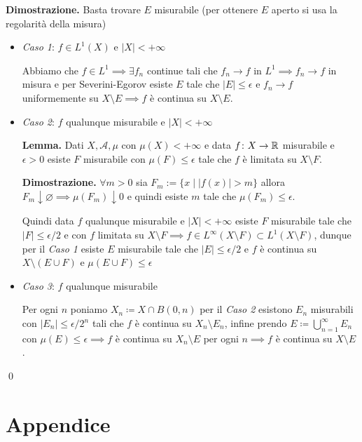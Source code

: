 \documentclass[a4paper, 12pt]{report}
\begin{document}
\textbf{Dimostrazione.}
Basta trovare $E$ misurabile (per ottenere $E$ aperto si usa la regolarità della misura)
\begin{itemize}
	\item \textit{Caso 1}:
		$f \in L^1(X)$ e $|X| < +\infty$

		Abbiamo che $f \in L^1 \implies \exists f_n$ continue tali che $f_n \to f$ in $L^1 \implies f_n \to f$ in misura e per Severini-Egorov esiste $E$ tale che $|E| \leq \epsilon$ e $f_n \to f$ uniformemente su $X \setminus E \implies f$ è continua su $X \setminus E$.

	\item \textit{Caso 2}:
		$f$ qualunque misurabile e $|X| < +\infty$

		\textbf{Lemma.}
		Dati $X, \mathcal A, \mu$ con $\mu(X) < +\infty$ e data $f \colon X \to \mathbb R$ misurabile e $\epsilon > 0$ esiste $F$ misurabile con $\mu(F) \leq \epsilon$ tale che $f$ è limitata su $X \setminus F$.
		
		\textbf{Dimostrazione.}
		$\forall m > 0$ sia $F_m := \{ x \mid |f(x)| > m \}$ allora $F_m \downarrow \varnothing \implies \mu(F_m) \downarrow 0$ e quindi esiste $m$ tale che $\mu(F_m) \leq \epsilon$.

		Quindi data $f$ qualunque misurabile e $|X| < +\infty$ esiste $F$ misurabile tale che $|F| \leq \epsilon / 2$ e con $f$ limitata su $X \setminus F \implies f \in L^\infty(X \setminus F) \subset L^1(X \setminus F)$, dunque per il \textit{Caso 1} esiste $E$ misurabile tale che $|E| \leq \epsilon / 2$ e $f$ è continua su $X \setminus (E \cup F)$ e $\mu(E \cup F) \leq \epsilon$

	\item \textit{Caso 3}:
		$f$ qualunque misurabile

		Per ogni $n$ poniamo $X_n \coloneqq X \cap B(0, n)$ per il \textit{Caso 2} esistono $E_n$ misurabili con $|E_n| \leq \epsilon / 2^n$ tali che $f$ è continua su $X_n \setminus E_n$, infine prendo $E \coloneqq \bigcup_{n=1}^\infty E_n$ con $\mu(E) \leq \epsilon \implies f$ è continua su $X_n \setminus E$ per ogni $n \implies f$ è continua su $X \setminus E$. 

\end{itemize}
\qed

%
%

\section{Appendice}
\end{document}
